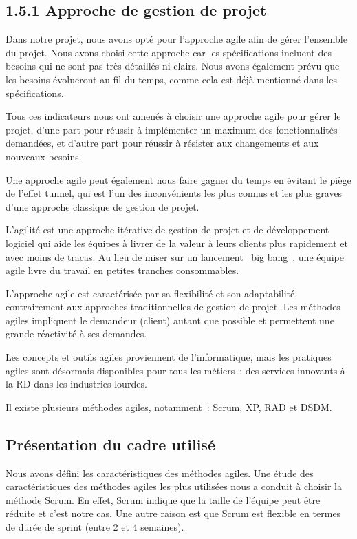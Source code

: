 \documentclass[12pt, letterpaper]{article}
\begin{document}
\subsection{1.5.1 Approche de gestion de projet}
Dans notre projet, nous avons opté pour l'approche agile afin de gérer l'ensemble du projet. Nous avons choisi cette approche car les spécifications incluent des besoins qui ne sont pas très détaillés ni clairs. Nous avons également prévu que les besoins évolueront au fil du temps, comme cela est déjà mentionné dans les spécifications. 

Tous ces indicateurs nous ont amenés à choisir une approche agile pour gérer le projet, d'une part pour réussir à implémenter un maximum des fonctionnalités demandées, et d'autre part pour réussir à résister aux changements et aux nouveaux besoins. 

Une approche agile peut également nous faire gagner du temps en évitant le piège de l'effet tunnel, qui est l'un des inconvénients les plus connus et les plus graves d'une approche classique de gestion de projet. 

L'agilité est une approche itérative de gestion de projet et de développement logiciel qui aide les équipes à livrer de la valeur à leurs clients plus rapidement et avec moins de tracas. Au lieu de miser sur un lancement  big bang , une équipe agile livre du travail en petites tranches consommables. 

L'approche agile est caractérisée par sa flexibilité et son adaptabilité, contrairement aux approches traditionnelles de gestion de projet. Les méthodes agiles impliquent le demandeur (client) autant que possible et permettent une grande réactivité à ses demandes. 

Les concepts et outils agiles proviennent de l'informatique, mais les pratiques agiles sont désormais disponibles pour tous les métiers : des services innovants à la RD dans les industries lourdes. 

Il existe plusieurs méthodes agiles, notamment : Scrum, XP, RAD et DSDM.

\subsection{Présentation du cadre utilisé}
Nous avons défini les caractéristiques des méthodes agiles. Une étude des caractéristiques des méthodes agiles les plus utilisées nous a conduit à choisir la méthode Scrum. En effet, Scrum indique que la taille de l'équipe peut être réduite et c'est notre cas. Une autre raison est que Scrum est flexible en termes de durée de sprint (entre 2 et 4 semaines).
\end{document}
